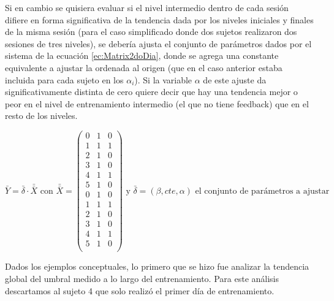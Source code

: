 \documentclass{article}
\numberwithin{figure}{section}
\begin{document}
    Si en cambio se quisiera evaluar si el nivel intermedio dentro de cada sesión difiere en forma significativa de la tendencia dada por los niveles iniciales y finales de la misma sesión (para el caso simplificado donde dos sujetos realizaron dos sesiones de tres niveles), se debería ajusta el conjunto de parámetros dados por el sistema de la ecuación \ref{ec:Matrix2doDia}, donde se agrega una constante equivalente a ajustar la ordenada al origen (que en el caso anterior estaba incluida para cada sujeto en los $\alpha_i$). Si la variable $\alpha$ de este ajuste da significativamente distinta de cero quiere decir que hay una tendencia mejor o peor en el nivel de entrenamiento intermedio (el que no tiene feedback) que en el resto de los niveles. 

    \begin{equation} \label{ec:Matrix2doDia}
    \bar {Y} = \bar{\delta} \cdot \bar{\bar{X}} \text{ con } \bar{\bar{X}} =
     \begin{pmatrix}
        0 & 1 & 0\\
        1 & 1 & 1\\
        2 & 1 & 0\\
        3 & 1 & 0\\
        4 & 1 & 1\\
        5 & 1 & 0\\
        0 & 1 & 0\\
        1 & 1 & 1\\
        2 & 1 & 0\\
        3 & 1 & 0\\
        4 & 1 & 1\\
        5 & 1 & 0\\
     \end{pmatrix} \text{ y $\bar{\delta}=(\beta,cte,\alpha)$ el conjunto de parámetros a ajustar}
    \end{equation}

    Dados los ejemplos conceptuales, lo primero que se hizo fue analizar la tendencia global del umbral medido a lo largo del entrenamiento. Para este análisis descartamos al sujeto 4 que solo realizó el primer día de entrenamiento. 
    
\end{document}
